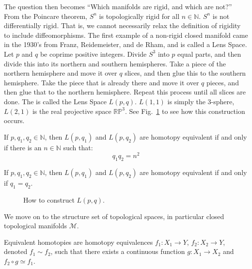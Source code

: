     The question then becomes
    ``Which manifolds are rigid, and which are not?''
    From the Poincare theorem, $S^{n}$ is topologically
    rigid for all $n\in\mathbb{N}$. $S^{n}$ is not differentially
    rigid. That is, we cannot necessarily relax the definition
    of rigidity to include diffeomorphisms.
    The first example of a non-rigid closed
    manifold came in the 1930's from Franz, Reidemeister,
    and de Rham, and is called a Lens Space.
    Let $p$ and $q$ be coprime positive integers.
    Divide $S^{3}$ into $p$ equal parts, and then divide
    this into its northern and southern hemispheres.
    Take a piece of the northern hemisphere and move
    it over $q$ slices, and then glue this to the
    southern hemisphere. Take the piece that is already
    there and move it over $q$ pieces, and then glue
    that to the northern hemisphere. Repeat this
    process until all slices are done. The is called
    the Lens Space $L(p,q)$. $L(1,1)$ is simply the
    3-sphere, $L(2,1)$ is the real projective space
    $\mathbb{RP}^{3}$.
    See Fig.~\ref{fig:surgery_theory_lens_space_drawing}
    to see how this construction occurs.
    \begin{theorem}
        If $p,q_{1},q_{2}\in\mathbb{N}$, then $L(p,q_{1})$ and
        $L(p,q_{2})$ are homotopy equivalent if and only if there
        is an $n\in\mathbb{N}$ such that:
        \begin{equation}
            q_{1}q_{2}=n^{2}
        \end{equation}
    \end{theorem}
    \begin{theorem}
        If $p,q_{1},q_{2}\in\mathbb{N}$, then $L(p,q_{1})$ and
        $L(p,q_{2})$ are homotopy equivalent if and only if
        $q_{1}=q_{2}$.
    \end{theorem}
    \begin{figure}[H]
        \centering
        \captionsetup{type=figure}
        
        \caption{How to construct $L(p,q)$.}
        \label{fig:surgery_theory_lens_space_drawing}
    \end{figure}
    We move on to the structure set of topological spaces,
    in particular closed topological
    manifolds $\mathcal{M}$.
    \begin{definition}
        Equivalent homotopies are homotopy equivalences
        $f_{1}:X_{1}\rightarrow Y$,
        $f_{2}:X_{2}\rightarrow Y$,
        denoted $f_{1}\sim{f_{2}}$, such that there
        exists a continuous function
        $g:X_{1}\rightarrow{X_{2}}$ and
        $f_{2}\circ{g}\simeq{f_{1}}$.
    \end{definition}
